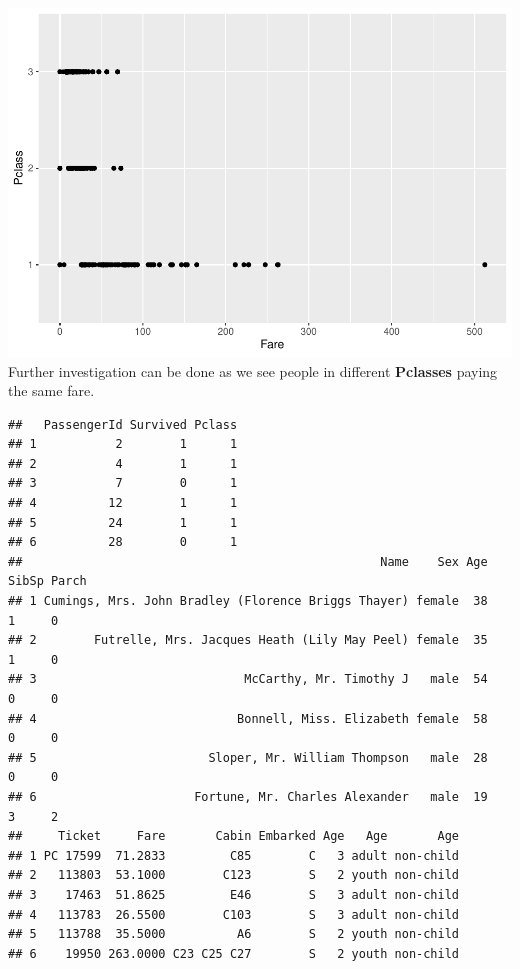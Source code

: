 \documentclass[
]{article}
\newenvironment{Shaded}{\begin{snugshade}}{\end{snugshade}}
\newcommand{\DecValTok}[1]{\textcolor[rgb]{0.00,0.00,0.81}{#1}}
\newcommand{\FunctionTok}[1]{\textcolor[rgb]{0.13,0.29,0.53}{\textbf{#1}}}
\newcommand{\NormalTok}[1]{#1}
\newcommand{\SpecialCharTok}[1]{\textcolor[rgb]{0.81,0.36,0.00}{\textbf{#1}}}
\begin{document}
\includegraphics{Titanic-Documentation_files/figure-latex/unnamed-chunk-26-1.pdf}
Further investigation can be done as we see people in different
\textbf{Pclasses} paying the same fare.

\begin{Shaded}
\end{Shaded}

\begin{verbatim}
##   PassengerId Survived Pclass
## 1           2        1      1
## 2           4        1      1
## 3           7        0      1
## 4          12        1      1
## 5          24        1      1
## 6          28        0      1
##                                                  Name    Sex Age SibSp Parch
## 1 Cumings, Mrs. John Bradley (Florence Briggs Thayer) female  38     1     0
## 2        Futrelle, Mrs. Jacques Heath (Lily May Peel) female  35     1     0
## 3                             McCarthy, Mr. Timothy J   male  54     0     0
## 4                            Bonnell, Miss. Elizabeth female  58     0     0
## 5                        Sloper, Mr. William Thompson   male  28     0     0
## 6                      Fortune, Mr. Charles Alexander   male  19     3     2
##     Ticket     Fare       Cabin Embarked Age   Age       Age
## 1 PC 17599  71.2833         C85        C   3 adult non-child
## 2   113803  53.1000        C123        S   2 youth non-child
## 3    17463  51.8625         E46        S   3 adult non-child
## 4   113783  26.5500        C103        S   3 adult non-child
## 5   113788  35.5000          A6        S   2 youth non-child
## 6    19950 263.0000 C23 C25 C27        S   2 youth non-child
\end{verbatim}
\end{document}
